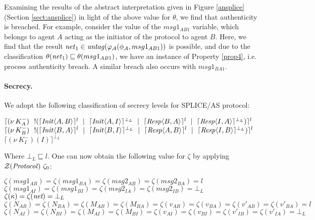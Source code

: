 \documentclass[10pt,a4paper,final,oneside,fleqn]{book}
\begin{document}
\noindent
Examining the results of the abstract interpretation given in Figure \ref{ansplice} (Section \ref{sect:ansplice}) in light of the above value for $\theta$, we find that authenticity is breached.  For example, consider the value of the $msg1_{AB1}$ variable, which belongs to agent $A$ acting as the initiator of the protocol to agent $B$. Here, we find that the result $\mbox{{\itshape net\/}}_1\in\mbox{{\itshape untag\/}}(\varphi_\mathcal{A}(\phi_\mathcal{A},msg1_{AB1}))$ is possible, and due to the classification $\theta(\mbox{{\itshape net\/}}_1)\sqsubseteq\theta(msg1_{AB1})$, we have an instance of Property \ref{prop4}, i.e. process authenticity breach. A similar breach also occurs with $msg1_{BA1}$.

\paragraph{Secrecy.} We adopt the following classification of secrecy levels for SPLICE/AS protocol:\vspace{5mm}

\noindent
$\lceil (\nu~\!K^-_{A})~~!(\lceil \mbox{{\itshape Init\/}}\langle A,B\rangle\rceil^l~\mid~\lceil \mbox{{\itshape Init\/}}\langle A,I\rangle\rceil^{\bot_L}~\mid~\lceil \mbox{{\itshape Resp\/}}\langle B,A\rangle\rceil^{l}~\mid~\lceil \mbox{{\itshape Resp\/}}\langle I,A\rangle\rceil^{\bot_L})\rceil^l$\\
$\lceil (\nu~\!K^-_{B})~~!(\lceil \mbox{{\itshape Init\/}}\langle B,A\rangle\rceil^l~\mid~\lceil \mbox{{\itshape Init\/}}\langle B,I\rangle\rceil^{\bot_L}~\mid~\lceil \mbox{{\itshape Resp\/}}\langle A,B\rangle\rceil^l~\mid~\lceil \mbox{{\itshape Resp\/}}\langle I,B\rangle\rceil^{\bot_L})\rceil^l$\\
$\lceil (\nu~\!K^-_I)(I)\rceil^{\bot_L}$\vspace{5mm}

\noindent
Where $\bot_L\sqsubseteq l$. One can now obtain the following value for $\zeta$ by applying $\mathcal{Z}(\mbox{{\itshape Protocol\/}})~\zeta_0$:\vspace{5mm}

\noindent
$\zeta(msg1_{AB})=\zeta(msg1_{BA})=\zeta(msg2_{AB})=\zeta(msg2_{BA})=l$\\
$\zeta(msg1_{AI})=\zeta(msg1_{BI})=\zeta(msg2_{IA})=\zeta(msg2_{IB})=\bot_L$\\
$\zeta(\kappa)=\zeta(\mbox{{\itshape net}})=\bot_L$\\
$\zeta(N_{AB})=\zeta(N_{BA})=\zeta(M_{AB})=\zeta(M_{BA})=\zeta(v_{AB})=\zeta(v_{BA})=\zeta(v'_{AB})=\zeta(v'_{BA})=l$\\
$\zeta(N_{AI})=\zeta(N_{BI})=\zeta(M_{AI})=\zeta(M_{BI})=\zeta(v_{AI})=\zeta(v_{BI})=\zeta(v'_{IB})=\zeta(v'_{IA})=\bot_L$\vspace{5mm}
\end{document}
